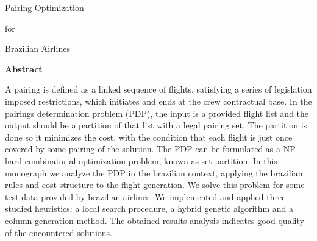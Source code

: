 \thispagestyle{empty}

\begin{center}

{\Large \sc Pairing Optimization}

\vspace{0.2cm}

{\Large \sc for}

\vspace{0.2cm}

{\Large \sc Brazilian Airlines}

\end{center}
\vspace{1cm}

\noindent
{\huge \bf Abstract}
\thispagestyle{empty}

\vspace{1.5cm}

\noindent
A pairing is defined as a linked sequence of flights, satisfying a series of legislation imposed
restrictions, which initiates and ends at the crew contractual base. In the pairings determination
problem (PDP), the input is a provided flight list and the output should be a partition of that list
with a legal pairing set. The partition is done so it minimizes the cost, with the condition that
each flight is just once covered by some pairing of the solution. The PDP can be formulated as a
NP-hard combinatorial optimization problem, known as set partition. In this monograph we analyze the
PDP in the brazilian context, applying the brazilian rules and cost structure to the flight
generation. We solve this problem for some test data provided by brazilian airlines. We implemented
and applied three studied heuristics: a local search procedure, a hybrid genetic algorithm and a
column generation method. The obtained results analysis indicates good quality of the encountered
solutions.




